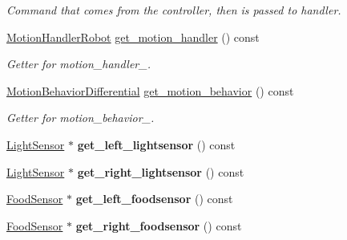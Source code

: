 \begin{DoxyCompactItemize}
\begin{DoxyCompactList}\small\item\em Command that comes from the controller, then is passed to handler. \end{DoxyCompactList}\item 
\hyperlink{classMotionHandlerRobot}{Motion\+Handler\+Robot} \hyperlink{classRobot_a923046846778386058ac43f7a3d56310}{get\+\_\+motion\+\_\+handler} () const \hypertarget{classRobot_a923046846778386058ac43f7a3d56310}{}\label{classRobot_a923046846778386058ac43f7a3d56310}

\begin{DoxyCompactList}\small\item\em Getter for motion\+\_\+handler\+\_\+. \end{DoxyCompactList}\item 
\hyperlink{classMotionBehaviorDifferential}{Motion\+Behavior\+Differential} \hyperlink{classRobot_a47029edd6cf8ccf3654dc16290710841}{get\+\_\+motion\+\_\+behavior} () const \hypertarget{classRobot_a47029edd6cf8ccf3654dc16290710841}{}\label{classRobot_a47029edd6cf8ccf3654dc16290710841}

\begin{DoxyCompactList}\small\item\em Getter for motion\+\_\+behavior\+\_\+. \end{DoxyCompactList}\item 
\hyperlink{classLightSensor}{Light\+Sensor} $\ast$ {\bfseries get\+\_\+left\+\_\+lightsensor} () const \hypertarget{classRobot_a002715d00e8db745fdb6306be4a9c5aa}{}\label{classRobot_a002715d00e8db745fdb6306be4a9c5aa}

\item 
\hyperlink{classLightSensor}{Light\+Sensor} $\ast$ {\bfseries get\+\_\+right\+\_\+lightsensor} () const \hypertarget{classRobot_ad38f90be16c81c98017dfe5f93a8ee9f}{}\label{classRobot_ad38f90be16c81c98017dfe5f93a8ee9f}

\item 
\hyperlink{classFoodSensor}{Food\+Sensor} $\ast$ {\bfseries get\+\_\+left\+\_\+foodsensor} () const \hypertarget{classRobot_a1dc4adb34232a53e49cb3a0e975c00c0}{}\label{classRobot_a1dc4adb34232a53e49cb3a0e975c00c0}

\item 
\hyperlink{classFoodSensor}{Food\+Sensor} $\ast$ {\bfseries get\+\_\+right\+\_\+foodsensor} () const \hypertarget{classRobot_aeefc18dc2d837b56fd434b02d0023b4f}{}\label{classRobot_aeefc18dc2d837b56fd434b02d0023b4f}


\end{DoxyCompactItemize}
